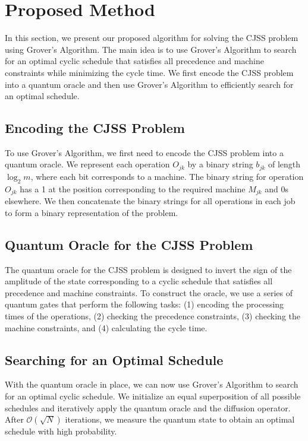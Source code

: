 \section{Proposed Method}
\label{sec:method}
In this section, we present our proposed algorithm for solving the CJSS problem using Grover's Algorithm. The main idea is to use Grover's Algorithm to search for an optimal cyclic schedule that satisfies all precedence and machine constraints while minimizing the cycle time. We first encode the CJSS problem into a quantum oracle and then use Grover's Algorithm to efficiently search for an optimal schedule.

\subsection{Encoding the CJSS Problem}
To use Grover's Algorithm, we first need to encode the CJSS problem into a quantum oracle. We represent each operation $O_{jk}$ by a binary string $b_{jk}$ of length $\log_2 m$, where each bit corresponds to a machine. The binary string for operation $O_{jk}$ has a 1 at the position corresponding to the required machine $M_{jk}$ and 0s elsewhere. We then concatenate the binary strings for all operations in each job to form a binary representation of the problem.

\subsection{Quantum Oracle for the CJSS Problem}
The quantum oracle for the CJSS problem is designed to invert the sign of the amplitude of the state corresponding to a cyclic schedule that satisfies all precedence and machine constraints.  To construct the oracle, we use a series of quantum gates that perform the following tasks: (1) encoding the processing times of the operations, (2) checking the precedence constraints, (3) checking the machine constraints, and (4) calculating the cycle time.

\subsection{Searching for an Optimal Schedule}
With the quantum oracle in place, we can now use Grover's Algorithm to search for an optimal cyclic schedule. We initialize an equal superposition of all possible schedules and iteratively apply the quantum oracle and the diffusion operator. After $\mathcal{O}(\sqrt{N})$ iterations, we measure the quantum state to obtain an optimal schedule with high probability.

